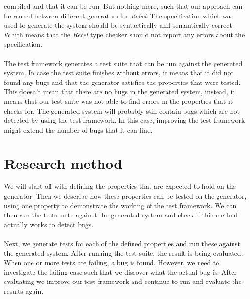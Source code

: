 compiled and that it can be run. But nothing more, such that our approach can be
reused between different generators for \textit{Rebel}. The specification which was used
to generate the system should be syntactically and semantically correct. Which
means that the \textit{Rebel} type checker should not report any errors about the
specification.\\
\\
The test framework generates a test suite that can be run against the generated
system. In case the test suite finishes without errors, it means that it did not
found any bugs and that the generator satisfies the properties that were tested.
This doesn't mean that there are no bugs in the generated system, instead, it
means that our test suite was not able to find errors in the properties that it
checks for. The generated system will probably still contain bugs which are not
detected by using the test framework. In this case, improving the test framework
might extend the number of bugs that it can find.

\section{Research method}
We will start off with defining the properties that are expected to hold on the
generator. Then we describe how these properties can be tested on the generator,
using one property to demonstrate the working of the test framework. We can then
run the tests suite against the generated system and check if this method
actually works to detect bugs.\\
\\
Next, we generate tests for each of the defined properties and run these against
the generated system. After running the test suite, the result is being
evaluated. When one or more tests are failing, a bug is found. However, we need
to investigate the failing case such that we discover what the actual bug is.
After evaluating we improve our test framework and continue to run and evaluate
the results again.

